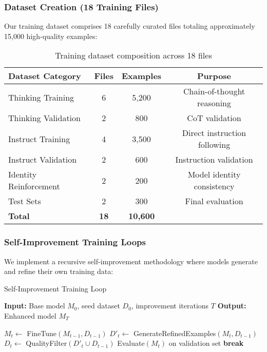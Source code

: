 \subsubsection{Dataset Creation (18 Training Files)}
Our training dataset comprises 18 carefully curated files totaling approximately 15,000 high-quality examples:

\begin{table}[H]
\centering
\begin{tabular}{lccc}
\toprule
Dataset Category & Files & Examples & Purpose \\
\midrule
Thinking Training & 6 & 5,200 & Chain-of-thought reasoning \\
Thinking Validation & 2 & 800 & CoT validation \\
Instruct Training & 4 & 3,500 & Direct instruction following \\
Instruct Validation & 2 & 600 & Instruction validation \\
Identity Reinforcement & 2 & 200 & Model identity consistency \\
Test Sets & 2 & 300 & Final evaluation \\
\midrule
\textbf{Total} & \textbf{18} & \textbf{10,600} & \\
\bottomrule
\end{tabular}
\caption{Training dataset composition across 18 files}
\label{tab:dataset-files}
\end{table}

\subsubsection{Self-Improvement Training Loops}
We implement a recursive self-improvement methodology where models generate and refine their own training data:

\begin{algorithm}[H]
\caption{Self-Improvement Training Loop}
\label{alg:self-improvement}
\begin{algorithmic}[1]
\STATE \textbf{Input:} Base model $M_0$, seed dataset $D_0$, improvement iterations $T$
\STATE \textbf{Output:} Enhanced model $M_T$

    \STATE $M_t \leftarrow$ FineTune$(M_{t-1}, D_{t-1})$
    \STATE $D'_t \leftarrow$ GenerateRefinedExamples$(M_t, D_{t-1})$
    \STATE $D_t \leftarrow$ QualityFilter$(D'_t \cup D_{t-1})$
    \STATE Evaluate$(M_t)$ on validation set
        \STATE \textbf{break}
    \ENDIF
\ENDFOR
\end{algorithmic}
\end{algorithm}

